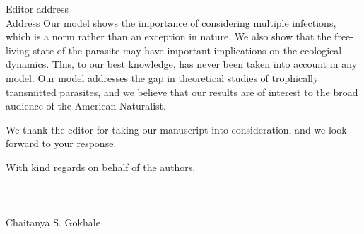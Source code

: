\documentclass[10,DIN, pagenumber=false, parskip=half,fromalign=right, fromphone=false,fromemail=false, fromurl=false,fromlogo=true, fromrule=false]{scrlttr2}
\begin{document}
\begin{letter}{
\sffamily
\vspace{-0.4cm}
Editor address\\
Address
}
Our model shows the importance of considering multiple infections, which is a norm rather than an exception in nature. 
We also show that the free-living state of the parasite may have important implications on the ecological dynamics.
This, to our best knowledge, has never been taken into account in any model. 
Our model addresses the gap in theoretical studies of trophically transmitted parasites,
and we believe that our results are of interest to the broad audience of the American Naturalist.

We thank the editor for taking our manuscript into consideration, and we look forward to your response.


With kind regards on behalf of the authors,\\
\\
\\
\\
Chaitanya S. Gokhale

\end{letter}
\end{document}
